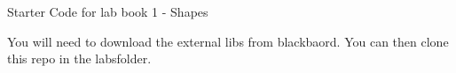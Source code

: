 Starter Code for lab book 1 -\/ Shapes

You will need to download the external libs from blackbaord. You can then clone this repo in the labsfolder. 